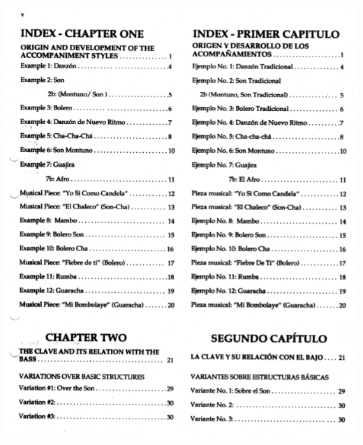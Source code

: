 \documentclass[a4paper]{book}
\begin{document}
\begin{center}
\includegraphics[width=16.244cm,height=20.052cm]{lebluessupportsmethodes-img176.png}
\end{center}
\end{document}

